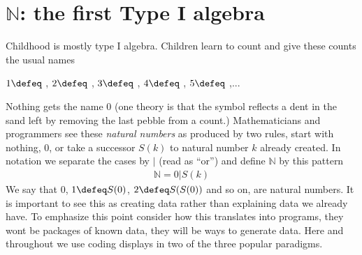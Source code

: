 \section{$\mathbb{N}$: the first Type I algebra}
Childhood is mostly type I algebra.  Children learn to count and give these counts 
the usual names
\begin{center}
    $1\defeq$ \StrokeOne,
    $2\defeq$ \StrokeTwo,
    $3\defeq$ \StrokeThree,
    $4\defeq$ \StrokeFour,
    $5\defeq$ \StrokeFive,...
\end{center}
Nothing gets the name $0$ (one theory is that the symbol reflects 
a dent in the sand left by removing the last pebble from a count.)
Mathematicians and programmers see these \emph{natural numbers}
as produced by two rules, start with nothing, $0$, or take a successor 
$S(k)$ to natural number $k$ already created.  In notation we separate the 
cases by $|$ (read as ``or'') and define $\mathbb{N}$ by this pattern
\begin{gather}
    \tag{Mathematics}
    \mathbb{N} = 0 | S(k)
\end{gather}
We say that $0$, $1\defeq S(0)$, $2\defeq S(S(0))$ and so on, are natural numbers.
It is important to see this as creating data rather than explaining data we 
already have.   To emphasize this 
point consider how this translates into programs, they wont be packages 
of known data, they will be ways to generate data.  Here and throughout 
we use coding displays in two of the three popular paradigms.

